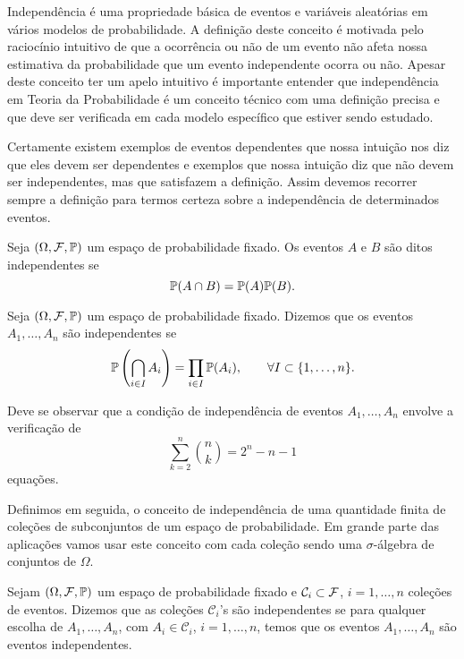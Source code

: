 Independência é uma propriedade básica de eventos e variáveis 
aleatórias em vários modelos de probabilidade. A definição deste
conceito é motivada pelo raciocínio intuitivo de que a ocorrência 
ou não de um evento não afeta nossa estimativa da probabilidade 
que um evento independente ocorra ou não. 
Apesar deste conceito ter um  apelo 
intuitivo é importante entender que independência em Teoria 
da Probabilidade é um conceito técnico com uma definição 
precisa e que deve ser verificada em cada modelo específico
que estiver sendo estudado.
 
Certamente existem exemplos de eventos dependentes que nossa 
intuição nos diz que eles devem ser dependentes e exemplos que 
nossa intuição diz que não devem ser independentes, mas que 
satisfazem a definição. Assim devemos recorrer sempre a definição 
para termos certeza sobre a independência de determinados eventos.  


\begin{definicao}
\label{def-2-eventos-independentes}
%
	Seja $(\Omega,\F,\P)$ um espaço de probabilidade fixado. 
	Os eventos $A$ e $B$ são ditos independentes  se 
		\[
			\P(A\cap B) = \P(A) \P(B).
		\]
%
\end{definicao}
%
%
%
%
%
\begin{definicao}\label{def-n-eventos-independentes}
Seja $(\Omega,\F,\P)$ um espaço de probabilidade fixado.
Dizemos que os eventos $A_1,\ldots,A_n$ são independentes
se 
	\[
		\P\left( \bigcap_{i\in I} A_i \right)
		=
		\prod_{i\in I} \P(A_i),
		\qquad
		\forall I\subset \{1,\ldots,n\}.
	\]	
\end{definicao}

Deve se observar que a condição de independência 
de eventos $A_1,\ldots,A_n$ envolve a verificação de 
	\[
		\sum_{k=2}^n \binom{n}{k} = 2^n-n-1
	\]
equações. 

Definimos em seguida, o conceito de independência de uma 
quantidade finita de coleções de subconjuntos de um espaço
de probabilidade. Em grande parte das aplicações vamos usar
este conceito com cada coleção sendo uma $\sigma$-álgebra 
de conjuntos de $\Omega$. 


\begin{definicao}
\label{def-n-colecoes-independentes}
Sejam $(\Omega,\F,\P)$ um espaço de probabilidade fixado
e $\mathcal{C}_i\subset \F$,  $i=1,\ldots,n$ 
coleções de eventos. 
Dizemos que as coleções $\mathcal{C}_i$'s são independentes
se para qualquer escolha de $A_1,\ldots,A_n$, 
com $A_i\in \mathcal{C}_i$, $i=1,\ldots,n$, temos que 
os eventos $A_1,\ldots,A_n$ são eventos independentes.
\end{definicao}

